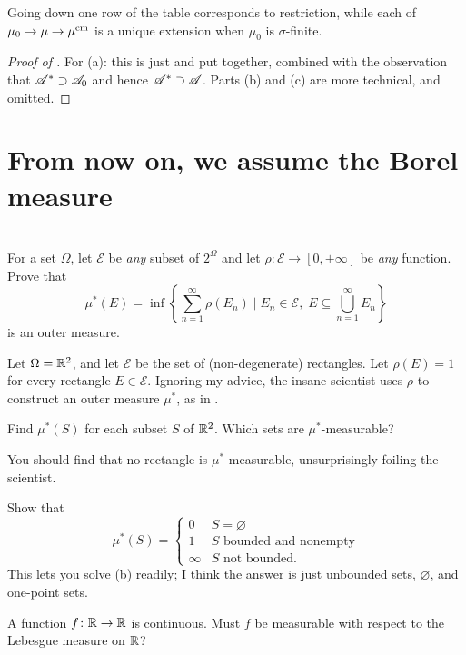 Going down one row of the table corresponds to restriction,
while each of $\mu_0 \to \mu \to \mu^\text{cm}$ is a unique extension
when $\mu_0$ is $\sigma$-finite.
\begin{proof}
	[Proof of ]
	For (a): this is just  and 
	put together, combined with the observation that $\mathscr A^\ast \supset \mathscr A_0$
	and hence $\mathscr A^\ast \supset \mathscr A$.
	Parts (b) and (c) are more technical, and omitted.
\end{proof}

\section{From now on, we assume the Borel measure}

\section{\problemhead}
\begin{dproblem}
	\label{pr:construct_outer_measure}
	For a set $\Omega$,
	let $\mathcal{E}$ be \emph{any} subset of $2^{\Omega}$
	and let $\rho \colon \mathcal{E} \to [0,+\infty]$
	be \emph{any} function.
	Prove that
	\[ \mu^\ast(E) = \inf \left\{ \sum_{n=1}^\infty \rho(E_n) \mid
		E_n \in \mathcal{E}, \;
		E \subseteq \bigcup_{n=1}^\infty E_n \right\} \]
	is an outer measure.
\end{dproblem}

\begin{problem}
	Let $\Omega = \mathbb R^2$, and let $\mathcal{E}$
	be the set of (non-degenerate) rectangles.
	Let $\rho(E) = 1$ for every rectangle $E \in \mathcal{E}$.
	Ignoring my advice, the insane scientist
	uses $\rho$ to construct an outer measure $\mu^\ast$,
	as in .
	\begin{enumerate}[(a)]
		\ii Find $\mu^\ast(S)$ for each subset $S$ of $\mathbb R^2$.
		\ii Which sets are $\mu^\ast$-measurable?
	\end{enumerate}
	You should find that no rectangle is $\mu^\ast$-measurable,
	unsurprisingly foiling the scientist.
	\begin{hint}
		Show that
		\[ \mu^\ast(S) = \begin{cases}
				0 & S = \varnothing \\
				1 & S \text{ bounded and nonempty} \\
				\infty & S \text{ not bounded}.
			\end{cases}
		\]
		This lets you solve (b) readily;
		I think the answer is just unbounded sets,
		$\varnothing$, and one-point sets.
	\end{hint}
\end{problem}

\begin{problem}
	\gim
	A function $f \colon \mathbb R \to \mathbb R$ is continuous.
	Must $f$ be measurable with respect to the Lebesgue measure on $\mathbb R$?
\end{problem}
